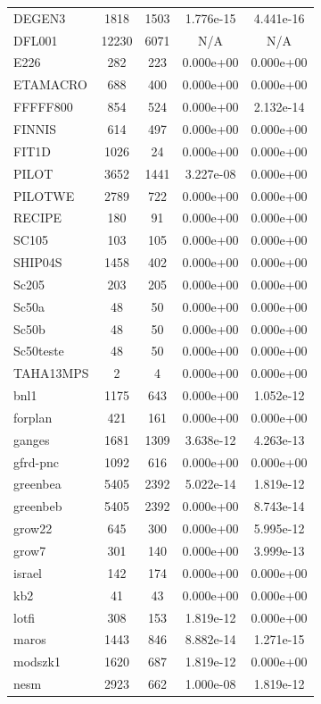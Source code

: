 \documentclass[12pt,a4paper]{article}
\begin{document}
\begin{longtable}{@{}l|cccc@{}}
DEGEN3 & 1818 & 1503 & 1.776e-15 & 4.441e-16 \\
DFL001 & 12230 & 6071 & N/A & N/A \\
E226 & 282 & 223 & 0.000e+00 & 0.000e+00 \\
ETAMACRO & 688 & 400 & 0.000e+00 & 0.000e+00 \\
FFFFF800 & 854 & 524 & 0.000e+00 & 2.132e-14 \\
FINNIS & 614 & 497 & 0.000e+00 & 0.000e+00 \\
FIT1D & 1026 & 24 & 0.000e+00 & 0.000e+00 \\
PILOT & 3652 & 1441 & 3.227e-08 & 0.000e+00 \\
PILOTWE & 2789 & 722 & 0.000e+00 & 0.000e+00 \\
RECIPE & 180 & 91 & 0.000e+00 & 0.000e+00 \\
SC105 & 103 & 105 & 0.000e+00 & 0.000e+00 \\
SHIP04S & 1458 & 402 & 0.000e+00 & 0.000e+00 \\
Sc205 & 203 & 205 & 0.000e+00 & 0.000e+00 \\
Sc50a & 48 & 50 & 0.000e+00 & 0.000e+00 \\
Sc50b & 48 & 50 & 0.000e+00 & 0.000e+00 \\
Sc50teste & 48 & 50 & 0.000e+00 & 0.000e+00 \\
TAHA13MPS & 2 & 4 & 0.000e+00 & 0.000e+00 \\
bnl1 & 1175 & 643 & 0.000e+00 & 1.052e-12 \\
forplan & 421 & 161 & 0.000e+00 & 0.000e+00 \\
ganges & 1681 & 1309 & 3.638e-12 & 4.263e-13 \\
gfrd-pnc & 1092 & 616 & 0.000e+00 & 0.000e+00 \\
greenbea & 5405 & 2392 & 5.022e-14 & 1.819e-12 \\
greenbeb & 5405 & 2392 & 0.000e+00 & 8.743e-14 \\
grow22 & 645 & 300 & 0.000e+00 & 5.995e-12 \\
grow7 & 301 & 140 & 0.000e+00 & 3.999e-13 \\
israel & 142 & 174 & 0.000e+00 & 0.000e+00 \\
kb2 & 41 & 43 & 0.000e+00 & 0.000e+00 \\
lotfi & 308 & 153 & 1.819e-12 & 0.000e+00 \\
maros & 1443 & 846 & 8.882e-14 & 1.271e-15 \\
modszk1 & 1620 & 687 & 1.819e-12 & 0.000e+00 \\
nesm & 2923 & 662 & 1.000e-08 & 1.819e-12 \\

\end{longtable}
\end{document}
